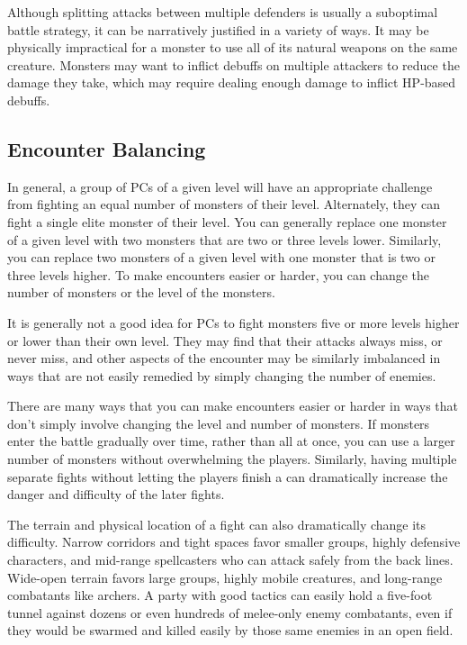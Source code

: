       Although splitting attacks between multiple defenders is usually a suboptimal battle strategy, it can be narratively justified in a variety of ways.
      It may be physically impractical for a monster to use all of its natural weapons on the same creature.
      Monsters may want to inflict debuffs on multiple attackers to reduce the damage they take, which may require dealing enough damage to inflict HP-based debuffs.

  \subsection{Encounter Balancing}\label{Encounter Balancing}
    In general, a group of PCs of a given level will have an appropriate challenge from fighting an equal number of monsters of their level.
    Alternately, they can fight a single elite monster of their level.
    You can generally replace one monster of a given level with two monsters that are two or three levels lower.
    Similarly, you can replace two monsters of a given level with one monster that is two or three levels higher.
    To make encounters easier or harder, you can change the number of monsters or the level of the monsters.

    It is generally not a good idea for PCs to fight monsters five or more levels higher or lower than their own level.
    They may find that their attacks always miss, or never miss, and other aspects of the encounter may be similarly imbalanced in ways that are not easily remedied by simply changing the number of enemies.

    There are many ways that you can make encounters easier or harder in ways that don't simply involve changing the level and number of monsters.
    If monsters enter the battle gradually over time, rather than all at once, you can use a larger number of monsters without overwhelming the players.
    Similarly, having multiple separate fights without letting the players finish a  can dramatically increase the danger and difficulty of the later fights.

    The terrain and physical location of a fight can also dramatically change its difficulty.
    Narrow corridors and tight spaces favor smaller groups, highly defensive characters, and mid-range spellcasters who can attack safely from the back lines.
    Wide-open terrain favors large groups, highly mobile creatures, and long-range combatants like archers.
    A party with good tactics can easily hold a five-foot tunnel against dozens or even hundreds of melee-only enemy combatants, even if they would be swarmed and killed easily by those same enemies in an open field.

